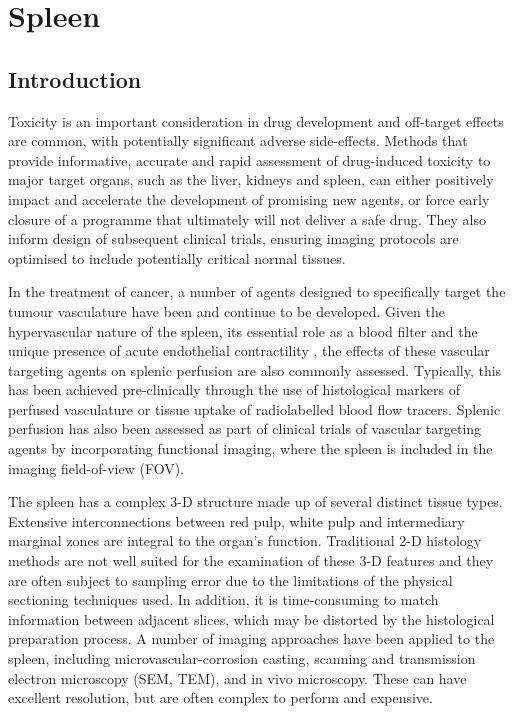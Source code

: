 \chapter{Spleen}
	
	\section{Introduction}
	
	
	
	
	Toxicity is an important consideration in drug development and off-target effects are common, with potentially significant adverse side-effects. Methods that provide informative, accurate and rapid assessment of drug-induced toxicity to major target organs, such as the liver, kidneys and spleen, can either positively impact and accelerate the development of promising new agents, or force early closure of a programme that ultimately will not deliver a safe drug. They also inform design of subsequent clinical trials, ensuring imaging protocols are optimised to include potentially critical normal tissues.
	
	
	In the treatment of cancer, a number of agents designed to specifically target the tumour vasculature have been and continue to be developed. Given the hypervascular nature of the spleen, its essential role as a blood filter and the unique presence of acute endothelial contractility \cite{raganspontaneous1988}, the effects of these vascular targeting agents on splenic perfusion are also commonly assessed. Typically, this has been achieved pre-clinically through the use of histological markers of perfused vasculature or tissue uptake of radiolabelled blood flow tracers. \cite{cullistumour2006, horsmanvascular2003} Splenic perfusion has also been assessed as part of clinical trials of vascular targeting agents by incorporating functional imaging, where the spleen is included in the imaging field-of-view (FOV). \cite{andersonassessment2003, evelhochmagnetic2004} 
	
	The spleen has a complex 3-D structure made up of several distinct tissue types. Extensive interconnections between red pulp, white pulp and intermediary marginal zones are integral to the organ's function. \cite{groomthe1987} Traditional 2-D histology methods are not well suited for the examination of these 3-D features and they are often subject to sampling error due to the limitations of the physical sectioning techniques used. In addition, it is time-consuming to match information between adjacent slices, which may be distorted by the histological preparation process. A number of imaging approaches have been applied to the spleen, including microvascular-corrosion casting, scanning and transmission electron microscopy (SEM, TEM), and in vivo microscopy. \cite{groomthe1987}  These can have excellent resolution, but are often complex to perform and expensive.
	
